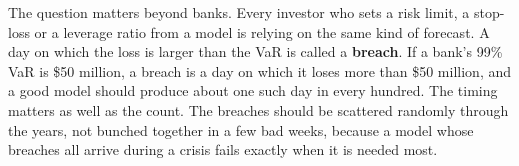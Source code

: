 The question matters beyond banks. Every investor who sets a risk limit, a stop-loss or a leverage ratio from a model is relying on the same kind of forecast. A day on which the loss is larger than the VaR is called a \textbf{breach}. If a bank's 99\% VaR is \$50 million, a breach is a day on which it loses more than \$50 million, and a good model should produce about one such day in every hundred. The timing matters as well as the count. The breaches should be scattered randomly through the years, not bunched together in a few bad weeks, because a model whose breaches all arrive during a crisis fails exactly when it is needed most.
\begin{figure}[htbp]
\centering
{}
\end{figure}
